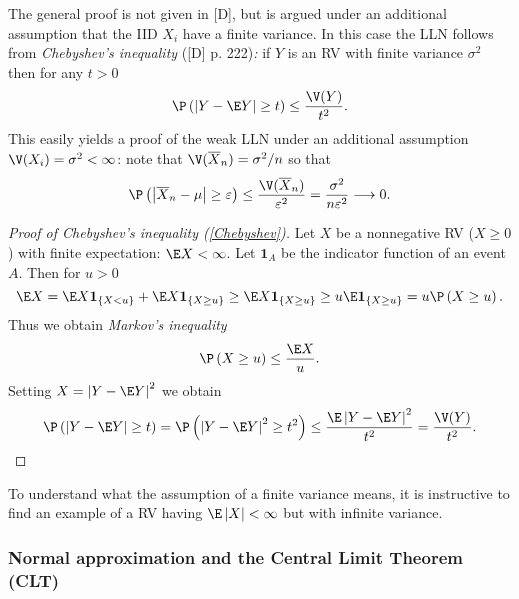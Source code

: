 The general proof is not given in [D], but is argued under an additional
assumption that the IID $X_{i}$ have a finite variance. In this case the
LLN follows from \textit{Chebyshev's inequality }([D] p. 222)\textit{: }if $%
Y $ is an RV with finite variance $\sigma ^{2}$ then for any $t>0$ \textit{%
\ }%
\begin{equation}
\P \left( \left\vert Y-\E Y\right\vert \geq t\right) \leq \frac{\V%
(Y)}{t^{2}}.  \label{Chebyshev}
\end{equation}%
This easily yields a proof of the weak LLN under an additional assumption $%
\V(X_{i})=\sigma ^{2}<\infty $: note that $\V(\overline{X}%
_{n})=\sigma ^{2}/n$ so that 
\begin{equation*}
\P \left( \left\vert \overline{X}_{n}-\mu \right\vert \geq \varepsilon \right)
\leq \frac{\V(\overline{X}_{n})}{\varepsilon ^{2}}=\frac{\sigma ^{2}}{%
n\varepsilon ^{2}}\longrightarrow 0.
\end{equation*}

\begin{proof}[Proof of Chebyshev's inequality (\protect\ref{Chebyshev})]
Let $X$ be a nonnegative RV ($X\geq 0$ ) with finite expectation: $%
\E X<\infty $. Let $\mathbf{1}_{A}$ be the indicator function of an event $A$.
Then for $u>0$ 
\begin{equation*}
\E X=\E X\mathbf{1}_{\left\{ X<u\right\} }+\E X\mathbf{1}_{\left\{ X\geq u\right\}
}\geq \E X\mathbf{1}_{\left\{ X\geq u\right\} }\geq u \E \mathbf{1}_{\left\{
X\geq u\right\} }=u\P \left( X\geq u\right) .
\end{equation*}%
Thus we obtain \textit{Markov's inequality} 
\begin{equation*}
\P \left( X\geq u\right) \leq \frac{\E X}{u}.
\end{equation*}%
Setting $X=\left\vert Y-\E Y\right\vert ^{2}$ we obtain 
\begin{equation*}
\P \left( \left\vert Y-\E Y\right\vert \geq t\right) =\P \left( \left\vert
Y-\E Y\right\vert ^{2}\geq t^{2}\right) \leq \frac{\E\left\vert Y-\E Y\right\vert
^{2}}{t^{2}}=\frac{\V(Y)}{t^{2}}.
\end{equation*}
\end{proof}

\bigskip \bigskip To understand what the assumption of a finite variance
means, it is instructive to find an example of a RV having $\E\left\vert
X\right\vert <\infty $ but with infinite variance.

\subsubsection{Normal approximation and the Central Limit Theorem (CLT)}

